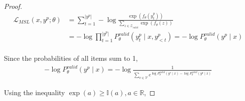 \documentclass[sigconf,natbib=true]{acmart}
\begin{document}
\begin{proof}
\begin{equation}
\begin{aligned}
\mathcal{L}_{MSL}(x,y^p;\theta) 
&= \sum_{t=1}^{|y^p|} - \log \frac{\exp(f_\theta(y_t^p))}{\sum_{z \in \mathcal{Z}_{valid}} \exp(f_\theta(z))} \\
&= - \log \prod_{t=1}^{|y^p|} P_{\theta}^{valid} \left(y^p_t \mid x, y^p_{<t}\right) = - \log P_{\theta}^{valid} \left(y^p \mid x \right) \\
\end{aligned}
\end{equation}

Since the probabilities of all items sum to 1,
\begin{equation}
\begin{aligned}
- \log P_{\theta}^{valid} \left(y^p \mid x \right) = - \log \frac{1}{\sum_{v \in \mathcal{V}} e^{\log P_{\theta}^{valid} \left(y^v \mid x \right) - \log P_{\theta}^{valid} \left(y^p \mid x \right)}}
\end{aligned}
\end{equation}

Using the inequality \(\exp(a) \geq \mathbb{I}(a), a \in \mathbb{R}\),


\end{proof}
\end{document}
